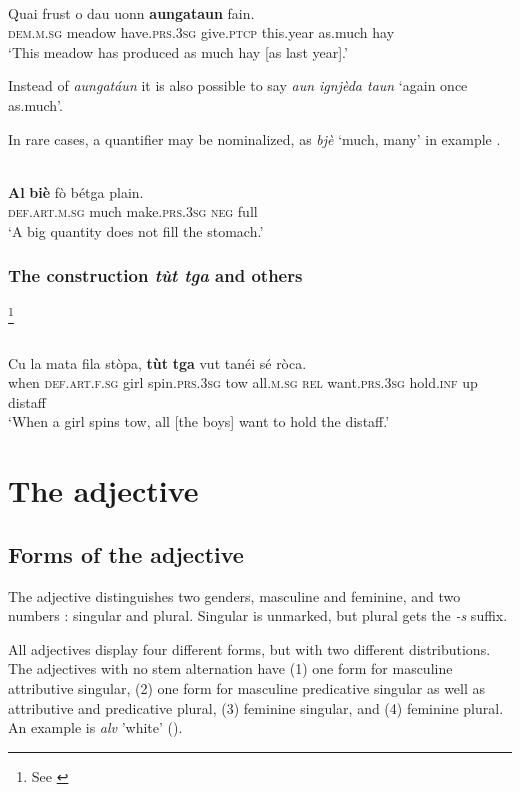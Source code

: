 {\ea\label{}
\\
\gll  Quai frust o dau uonn \textbf{aungataun} fain. \\
    \textsc{dem.m.sg}	meadow have.\textsc{prs.3sg} give.\textsc{ptcp} this.year as.much hay \\
\glt `This meadow has produced as much hay [as last year].'
\z

Instead of \textit{aungatáun} it is also possible to say \textit{aun ignjèda taun} `again once as.much'.

In rare cases, a quantifier may be nominalized, as \textit{bjè} `much, many' in example .

\ea\label{quantnom}
\\
\gll    \textbf{Al} \textbf{biè} fò bétga plain.\\
     \textsc{def.art.m.sg} much make.\textsc{prs.3sg} \textsc{neg} full\\
\glt `A big quantity does not fill the stomach.'
\z

\subsubsection{The construction \textit{tùt tga} and others}\footnote{See \citet{Linder1987}}

\ea\label{}
\\
\gll  Cu la mata fila stòpa, \textbf{tùt} \textbf{tga} vut tanéi sé ròca. \\
    when \textsc{def.art.f.sg} girl spin.\textsc{prs.3sg} tow all.\textsc{m.sg} \textsc{rel} want.\textsc{prs.3sg} hold.\textsc{inf} up distaff \\
\glt `When a girl spins tow, all [the boys] want to hold the distaff.'
\z


\section{The adjective}
\subsection{Forms of the adjective}
The adjective distinguishes two genders, masculine and feminine, and two numbers : singular and plural. Singular is unmarked, but plural gets the \textit{-s} suffix.

All adjectives display four different forms, but with two different distributions. The adjectives with no stem alternation have 
(1) one form for masculine attributive singular, 
(2) one form for masculine predicative singular as well as attributive and predicative plural, 
(3) feminine singular, and 
(4) feminine plural. 
An example is \textit{alv} 'white' ().

}
